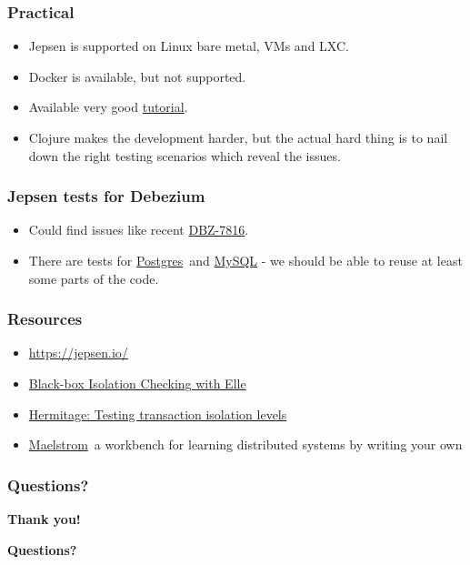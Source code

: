 \documentclass[10pt,utf8]{beamer}
\begin{document}
\begin{frame}
    \frametitle{Practical}
    \begin{itemize}
      \item Jepsen is supported on Linux bare metal, VMs and LXC.
      \item Docker is available, but not supported.
      \item Available very good \color{blue}\href{https://github.com/jepsen-io/jepsen/blob/main/doc/tutorial/index.md}{tutorial}\color{black}.
      \item Clojure makes the development harder, but the actual hard thing is to nail down the right testing scenarios which reveal the issues.
    \end{itemize}
\end{frame}

\begin{frame}
    \frametitle{Jepsen tests for Debezium}
    \begin{itemize}
      \item Could find issues like recent \color{blue}\href{https://issues.redhat.com/browse/DBZ-7816}{DBZ-7816}\color{black}.
      \item There are tests for \color{blue}\href{https://github.com/jepsen-io/postgres}{Postgres}\color{black}~and \color{blue}\href{https://github.com/jepsen-io/mysql}{MySQL}\color{black} - we should be able to reuse at least some parts of the code.
    \end{itemize}
\end{frame}

\begin{frame}
    \frametitle{Resources}
    \begin{itemize}
        \color{blue}
        \item \href{https://jepsen.io/}{https://jepsen.io/}
        \item \href{https://www.youtube.com/watch?v=OPJ_IcdSqig}{Black-box Isolation Checking with Elle}
        \item \href{https://github.com/ept/hermitage/}{Hermitage: Testing transaction isolation levels}
        \item \href{https://github.com/jepsen-io/maelstrom}{Maelstrom}\color{black}~a workbench for learning distributed systems by writing your own
    \end{itemize}
\end{frame}

\begin{frame}
    \frametitle{Questions?}
    \centering
     \textbf{\Huge{Thank you!}}
    
    \vspace{1.5cm}
    
    \textbf{\Huge{Questions?}}
    
    \vspace{1cm}
\end{frame}


\end{document}
